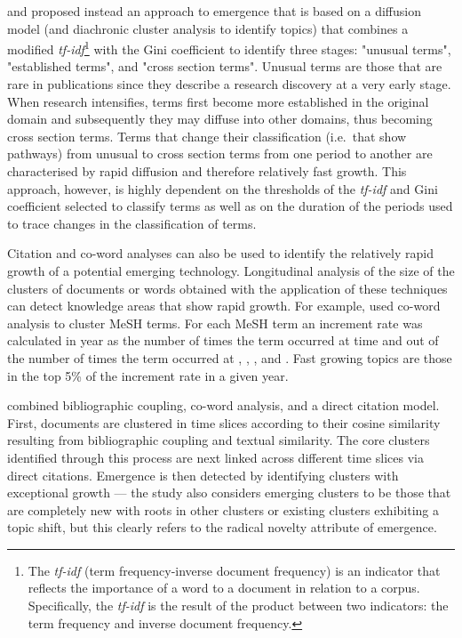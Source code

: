 \documentclass[11pt]{article}
\begin{document}
\cite{Schiebel2010} and \cite{Roche2010} proposed instead an approach to emergence that is based on a diffusion model (and diachronic cluster analysis to identify topics) that combines a modified \textit{tf-idf}\footnote{The \textit{tf-idf} (term frequency-inverse document frequency) is an indicator that reflects the importance of a word to a document in relation to a corpus. Specifically, the \textit{tf-idf} is the result of the product between two indicators: the term frequency and inverse document frequency.} with the Gini coefficient to identify three stages:  "unusual terms", "established terms", and "cross section terms". Unusual terms are those that are rare in publications since they describe a research discovery at a very early stage. When research intensifies, terms first become more established in the original domain and subsequently they may diffuse into other domains, thus becoming cross section terms. Terms that change their classification (i.e.\ that show pathways) from unusual to cross section terms from one period to another are characterised by rapid diffusion and therefore relatively fast growth. This approach, however, is highly dependent on the thresholds of the \textit{tf-idf} and Gini coefficient selected to classify terms as well as on the duration of the periods used to trace changes in the classification of terms.

Citation and co-word analyses can also be used to identify the relatively rapid growth of a potential emerging technology. Longitudinal analysis of the size of the clusters of documents or words obtained with the application of these techniques can detect knowledge areas that show rapid growth. For example, \cite{Ohniwa2010} used co-word analysis to cluster MeSH terms. For each MeSH term an increment rate was calculated in year  as the number of times the term occurred at time  and  out of the number of times the term occurred at , , , and . Fast growing topics are those in the top 5\% of the increment rate in a given year. 

\cite{Glanzel2012} combined bibliographic coupling, co-word analysis, and a direct citation model. First, documents are clustered in time slices according to their cosine similarity resulting from bibliographic coupling and textual similarity. The core clusters identified through this process are next linked across different time slices via direct citations. Emergence is then detected by identifying clusters with exceptional growth --- the study also considers emerging clusters to be those that are completely new with roots in other clusters or existing clusters exhibiting a topic shift, but this clearly refers to the radical novelty attribute of emergence. 
\end{document}
